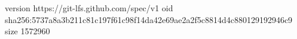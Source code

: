 version https://git-lfs.github.com/spec/v1
oid sha256:5737a8a3b211c81c197f61c98f14da42e69ae2a2f5c8814d4c880129192946c9
size 1572960
